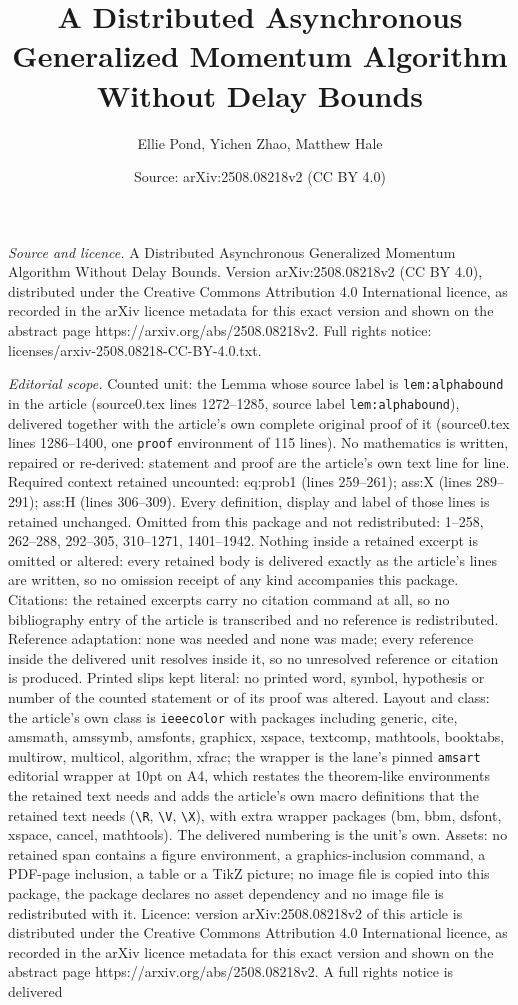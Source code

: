 \documentclass[10pt,a4paper]{amsart}
\title[A Distributed Asynchronous Generalized Momentum Algorithm Wi]{A Distributed Asynchronous Generalized Momentum Algorithm Without Delay Bounds}
\author{Ellie Pond, Yichen Zhao, Matthew Hale}
\date{Source: arXiv:2508.08218v2 (CC BY 4.0)}
\begin{document}
\maketitle

\noindent\emph{Source and licence.} A Distributed Asynchronous Generalized Momentum Algorithm Without Delay Bounds. Version arXiv:2508.08218v2 (CC BY 4.0), distributed under the Creative Commons Attribution 4.0 International licence, as recorded in the arXiv licence metadata for this exact version and shown on the abstract page https://arxiv.org/abs/2508.08218v2. Full rights notice: licenses/arxiv-2508.08218-CC-BY-4.0.txt.\par\smallskip

\noindent\textit{Editorial scope.} Counted unit: the Lemma whose source label is \texttt{lem:alphabound} in the article (source0.tex lines 1272--1285, source label \texttt{lem:alphabound}), delivered together with the article's own complete original proof of it (source0.tex lines 1286--1400, one \texttt{proof} environment of 115 lines). No mathematics is written, repaired or re-derived: statement and proof are the article's own text line for line. Required context retained uncounted: eq:prob1 (lines 259--261); ass:X (lines 289--291); ass:H (lines 306--309). Every definition, display and label of those lines is retained unchanged. Omitted from this package and not redistributed: 1--258, 262--288, 292--305, 310--1271, 1401--1942. Nothing inside a retained excerpt is omitted or altered: every retained body is delivered exactly as the article's lines are written, so no omission receipt of any kind accompanies this package. Citations: the retained excerpts carry no citation command at all, so no bibliography entry of the article is transcribed and no reference is redistributed. Reference adaptation: none was needed and none was made; every reference inside the delivered unit resolves inside it, so no unresolved reference or citation is produced. Printed slips kept literal: no printed word, symbol, hypothesis or number of the counted statement or of its proof was altered. Layout and class: the article's own class is \texttt{ieeecolor} with packages including generic, cite, amsmath, amssymb, amsfonts, graphicx, xspace, textcomp, mathtools, booktabs, multirow, multicol, algorithm, xfrac; the wrapper is the lane's pinned \texttt{amsart} editorial wrapper at 10pt on A4, which restates the theorem-like environments the retained text needs and adds the article's own macro definitions that the retained text needs (\texttt{\textbackslash R}, \texttt{\textbackslash V}, \texttt{\textbackslash X}), with extra wrapper packages (bm, bbm, dsfont, xspace, cancel, mathtools). The delivered numbering is the unit's own. Assets: no retained span contains a figure environment, a graphics-inclusion command, a PDF-page inclusion, a table or a TikZ picture; no image file is copied into this package, the package declares no asset dependency and no image file is redistributed with it. Licence: version arXiv:2508.08218v2 of this article is distributed under the Creative Commons Attribution 4.0 International licence, as recorded in the arXiv licence metadata for this exact version and shown on the abstract page https://arxiv.org/abs/2508.08218v2. A full rights notice is delivered 
\end{document}

